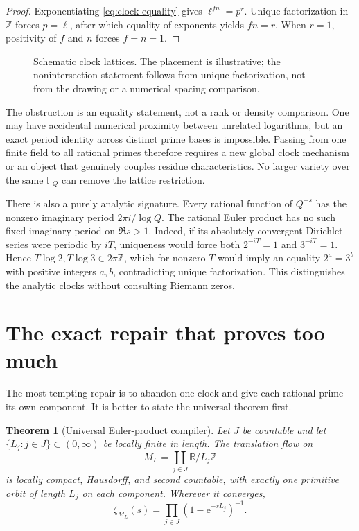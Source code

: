 \documentclass[11pt]{article}
\newtheorem{theorem}{Theorem}
\theoremstyle{definition}
\theoremstyle{remark}
\newcommand{\R}{\mathbb{R}}
\newcommand{\Z}{\mathbb{Z}}
\newcommand{\F}{\mathbb{F}}
\newcommand{\e}{\mathrm{e}}
\begin{document}
\begin{proof}
Exponentiating \eqref{eq:clock-equality} gives
\(\ell^{fn}=p^r\).  Unique factorization in \(\Z\) forces \(p=\ell\),
after which equality of exponents yields \(fn=r\).  When \(r=1\), positivity
of \(f\) and \(n\) forces \(f=n=1\).
\end{proof}

\begin{figure}[t]
  \centering
  
  \caption{Schematic clock lattices.  The placement is illustrative; the
  nonintersection statement follows from unique factorization, not from the
  drawing or a numerical spacing comparison.}
  \label{fig:clocks}
\end{figure}

The obstruction is an equality statement, not a rank or density comparison.
One may have accidental numerical proximity between unrelated logarithms, but
an exact period identity across distinct prime bases is impossible.  Passing
from one finite field to all rational primes therefore requires a new global
clock mechanism or an object that genuinely couples residue characteristics.
No larger variety over the same \(\F_Q\) can remove the lattice restriction.

There is also a purely analytic signature.  Every rational function of
\(Q^{-s}\) has the nonzero imaginary period \(2\pi i/\log Q\).  The rational
Euler product has no such fixed imaginary period on \(\Re s>1\).  Indeed, if
its absolutely convergent Dirichlet series were periodic by \(iT\), uniqueness
would force both \(2^{-iT}=1\) and \(3^{-iT}=1\).  Hence
\(T\log2,T\log3\in2\pi\Z\), which for nonzero \(T\) would imply an equality
\(2^a=3^b\) with positive integers \(a,b\), contradicting unique
factorization.  This distinguishes the analytic clocks without consulting
Riemann zeros.

\section{The exact repair that proves too much}
\label{sec:compiler}

The most tempting repair is to abandon one clock and give each rational prime
its own component.  It is better to state the universal theorem first.

\begin{theorem}[Universal Euler-product compiler]
\label{thm:compiler}
Let \(J\) be countable and let \(\{L_j:j\in J\}\subset(0,\infty)\) be locally
finite in length.  The translation flow on
\begin{equation}
  M_L=\coprod_{j\in J}\R/L_j\Z
  \label{eq:compiler-space}
\end{equation}
is locally compact, Hausdorff, and second countable, with exactly one
primitive orbit of length \(L_j\) on each component.  Wherever it converges,
\begin{equation}
  \zeta_{M_L}(s)=\prod_{j\in J}(1-\e^{-sL_j})^{-1}.
  \label{eq:compiler-product}
\end{equation}
\end{theorem}
\end{document}
